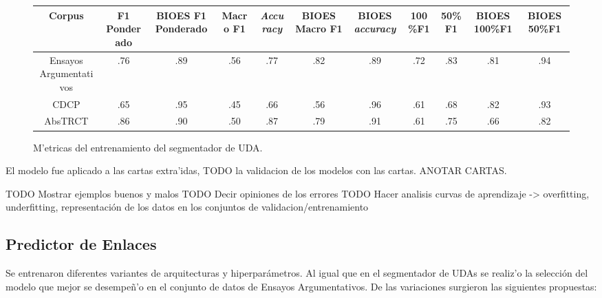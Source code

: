 \begin{figure}[h!]
	\begin{center}
		\begin{tabular}{|c|c|c|c|c|c|c|c|c|c|c|} \hline
        Corpus		            & F1 Ponderado  & BIOES F1 Ponderado  & Macro F1	& \emph{Accuracy} & BIOES Macro F1 & BIOES \emph{accuracy} & 100\%F1 & 50\%F1 & BIOES 100\%F1 & BIOES 50\%F1   \\ \hline
        Ensayos Argumentativos  & .76           & .89                 & .56 		& .77		      & .82	           & .89                   & .72	 & .83	  & .81	          & .94 	       \\ \hline
        CDCP		            & .65           & .95                 & .45 		& .66		      & .56	           & .96	               & .61	 & .68	  & .82	          & .93 	       \\ \hline
        AbsTRCT	                & .86           & .90                 & .50 		& .87		      & .79	           & .91	               & .61	 & .75	  & .66	          & .82 	       \\ \hline
        \end{tabular}
	\caption{M'etricas del entrenamiento del segmentador de UDA.}\label{fig:train_metrics_segmenter}
	\end{center}
\end{figure}

El modelo fue aplicado a las cartas extra'idas, TODO la validacion de los modelos con las cartas. ANOTAR CARTAS.

TODO Mostrar ejemplos buenos y malos
TODO Decir opiniones de los errores
TODO Hacer analisis curvas de aprendizaje -> overfitting, underfitting, representación de los datos en los conjuntos de validacion/entrenamiento

\subsection{Predictor de Enlaces}

Se entrenaron diferentes variantes de arquitecturas y hiperparámetros. Al igual que en el segmentador de
UDAs se realiz'o la selección del modelo que mejor se desempeñ'o en el conjunto de datos de Ensayos Argumentativos.
De las variaciones surgieron las siguientes propuestas:

